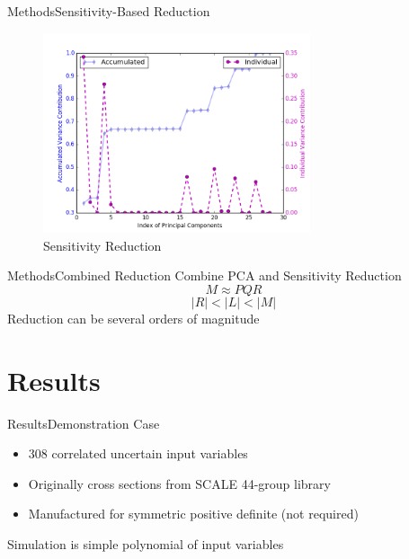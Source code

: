 \documentclass{beamer}
\begin{document}
\begin{frame}{Methods}{Sensitivity-Based Reduction}%
  \begin{figure}[h!]
    \centering
      \includegraphics[width=0.7\textwidth]{graphics/variance_contribs_example.png}
      \caption{Sensitivity Reduction}
  \end{figure}
\end{frame}

\begin{frame}{Methods}{Combined Reduction}%
  Combine PCA and Sensitivity Reduction
  \begin{equation}
    M \approx P Q R \nonumber
  \end{equation}
  \[|R| < |L| < |M|\]
  \vspace{10pt}
  Reduction can be several orders of magnitude
\end{frame}

\section{Results}
\begin{frame}{Results}{Demonstration Case}\vspace{-30pt}
  \begin{itemize}
    \item 308 correlated uncertain input variables
    \item Originally cross sections from SCALE 44-group library
    \item Manufactured for symmetric positive definite (not required)
  \end{itemize}
  Simulation is simple polynomial of input variables
\end{frame}
\end{document}

